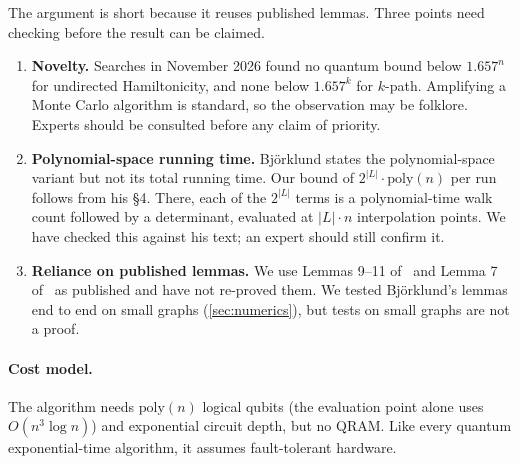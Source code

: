 \documentclass[11pt,a4paper]{article}
\theoremstyle{plain}
\theoremstyle{remark}
\begin{document}
The argument is short because it reuses published lemmas. Three points need checking before the result can be claimed.
\begin{enumerate}[nosep]
  \item \textbf{Novelty.} Searches in November 2026 found no quantum bound below $1.657^n$ for undirected Hamiltonicity, and none below $1.657^k$ for $k$-path. Amplifying a Monte Carlo algorithm is standard, so the observation may be folklore. Experts should be consulted before any claim of priority.
  \item \textbf{Polynomial-space running time.} Björklund states the polynomial-space variant but not its total running time. Our bound of $2^{|L|}\cdot\mathrm{poly}(n)$ per run follows from his \S 4. There, each of the $2^{|L|}$ terms is a polynomial-time walk count followed by a determinant, evaluated at $|L|\cdot n$ interpolation points. We have checked this against his text; an expert should still confirm it.
  \item \textbf{Reliance on published lemmas.} We use Lemmas 9--11 of~\cite{bjorklund} and Lemma 7 of~\cite{bhkk} as published and have not re-proved them. We tested Björklund's lemmas end to end on small graphs (\cref{sec:numerics}), but tests on small graphs are not a proof.
\end{enumerate}

\paragraph{Cost model.}
The algorithm needs $\mathrm{poly}(n)$ logical qubits (the evaluation point alone uses $O(n^3\log n)$) and exponential circuit depth, but no QRAM. Like every quantum exponential-time algorithm, it assumes fault-tolerant hardware.

\end{document}

